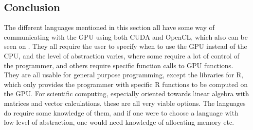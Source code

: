  

\subsection{Conclusion}  

The different languages mentioned in this section all have some way of communicating with the GPU using both CUDA and OpenCL, which also can be seen on  .
They all require the user to specify when to use the GPU instead of the CPU, and the level of abstraction varies, where some require a lot of control of the programmer, and others require specific function calls to GPU functions.
They are all usable for general purpose programming, except the libraries for R, which only provides the programmer with specific R functions to be computed on the GPU.
For scientific computing, especially oriented towards linear algebra with matrices and vector calculations, these are all very viable options.
The languages do require some knowledge of them, and if one were to choose a language with low level of abstraction, one would need knowledge of allocating memory etc.

                     